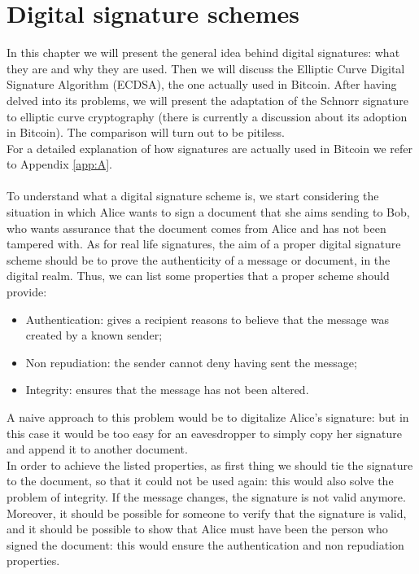 \chapter{Digital signature schemes}
\label{chpr:dss}

In this chapter we will present the general idea behind digital signatures: what they are and why they are used. Then we will discuss the Elliptic Curve Digital Signature Algorithm (ECDSA), the one actually used in Bitcoin. After having delved into its problems, we will present the adaptation of the Schnorr signature to elliptic curve cryptography (there is currently a discussion about its adoption in Bitcoin). The comparison will turn out to be pitiless.
\\
For a detailed explanation of how signatures are actually used in Bitcoin we refer to Appendix \ref{app:A}.
\\
\\
To understand what a digital signature scheme is, we start considering the situation in which Alice wants to sign a document that she aims sending to Bob, who wants assurance that the document comes from Alice and has not been tampered with. As for real life signatures, the aim of a proper digital signature scheme should be to prove the authenticity of a message or document, in the digital realm. Thus, we can list some properties that a proper scheme should provide:
\begin{itemize}
	\item Authentication: gives a recipient reasons to believe that the message was created by a known sender;
	\item Non repudiation: the sender cannot deny having sent the message;
	\item Integrity: ensures that the message has not been altered.
\end{itemize}
A naive approach to this problem would be to digitalize Alice's signature: but in this case it would be too easy for an eavesdropper to simply copy her signature and append it to another document. 
\\
In order to achieve the listed properties, as first thing we should tie the signature to the document, so that it could not be used again: this would also solve the problem of integrity. If the message changes, the signature is not valid anymore.  Moreover, it should be possible for someone to verify that the signature is valid, and it should be possible to show that Alice must have been the person who signed the document: this would ensure the authentication and non repudiation properties. 
